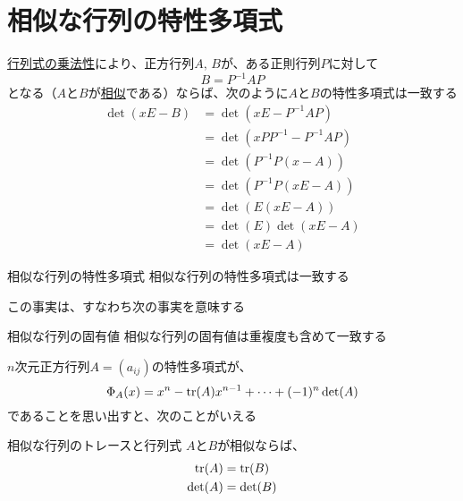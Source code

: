 \documentclass[../../../topic_linear-algebra]{subfiles}
\begin{document}
\sectionline
\section{相似な行列の特性多項式}

\hyperref[thm:determinant-multiplicativity]{行列式の乗法性}により、正方行列$A,\,B$が、ある正則行列$P$に対して
\begin{equation*}
  B = P^{-1}AP
\end{equation*}
となる（$A$と$B$が\hyperref[def:similar-matrices]{相似}である）ならば、次のように$A$と$B$の特性多項式は一致する
\begin{align*}
  \det(xE - B) & = \det(xE - P^{-1}AP)       \\
               & = \det(xPP^{-1} - P^{-1}AP) \\
               & = \det(P^{-1}P(x - A))      \\
               & = \det(P^{-1}P(xE - A))     \\
               & = \det(E(xE - A))           \\
               & = \det(E)\det(xE - A)       \\
               & = \det(xE - A)
\end{align*}

\begin{theorem}{相似な行列の特性多項式}\label{thm:char-poly-of-similar-matrices}
  相似な行列の特性多項式は一致する
\end{theorem}

この事実は、すなわち次の事実を意味する

\begin{theorem}{相似な行列の固有値}\label{thm:eigenvalues-of-similar-matrices}
  相似な行列の固有値は重複度も含めて一致する
\end{theorem}

\sectionline

$n$次元正方行列$A = (a_{ij})$の特性多項式が、
\begin{equation*}
  \Phi_A(x) = x^n - \tr(A)x^{n-1} + \cdots + (-1)^n \det(A)
\end{equation*}
であることを思い出すと、次のことがいえる

\begin{theorem}{相似な行列のトレースと行列式}
  $A$と$B$が相似ならば、
  \begin{align*}
    \tr(A)  & = \tr(B)  \\
    \det(A) & = \det(B)
  \end{align*}
\end{theorem}
\end{document}
